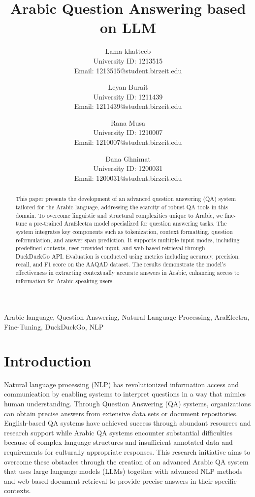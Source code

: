 \documentclass[conference]{IEEEtran}
\title{Arabic Question Answering based on LLM}
\author{
    Lama khatteeb \\ University ID: 1213515 \\ Email: 1213515@student.birzeit.edu \\
    \and
    Leyan Burait \\ University ID: 1211439 \\ Email: 1211439@student.birzeit.edu \\
    \and
    Rana Musa \\ University ID: 1210007 \\ Email: 1210007@student.birzeit.edu \\
    \and
    Dana Ghnimat \\ University ID: 1200031 \\ Email: 1200031@student.birzeit.edu \\
}
\begin{document}
\maketitle

\begin{abstract}
This paper presents the development of an advanced question answering (QA) system tailored for the Arabic language, addressing the scarcity of robust QA tools in this domain. To overcome linguistic and structural complexities unique to Arabic, we fine-tune a pre-trained AraElectra model specialized for question answering tasks. The system integrates key components such as tokenization, context formatting, question reformulation, and answer span prediction. It supports multiple input modes, including predefined contexts, user-provided input, and web-based retrieval through DuckDuckGo API. Evaluation is conducted using metrics including accuracy, precision, recall, and F1 score on the AAQAD dataset. The results demonstrate the model’s effectiveness in extracting contextually accurate answers in Arabic, enhancing access to information for Arabic-speaking users.
\end{abstract}

\begin{IEEEkeywords}
Arabic language, Question Answering, Natural Language Processing, AraElectra, Fine-Tuning, DuckDuckGo, NLP
\end{IEEEkeywords}


\section{Introduction}
Natural language processing (NLP) has revolutionized information access and communication by enabling systems to interpret questions in a way that mimics human understanding. Through Question Answering (QA) systems, organizations can obtain precise answers from extensive data sets or document repositories. English-based QA systems have achieved success through abundant resources and research support while Arabic QA systems encounter substantial difficulties because of complex language structures and insufficient annotated data and requirements for culturally appropriate responses. This research initiative aims to overcome these obstacles through the creation of an advanced Arabic QA system that uses large language models (LLMs) together with advanced NLP methods and web-based document retrieval to provide precise answers in their specific contexts\cite{b1}.
\end{document}
